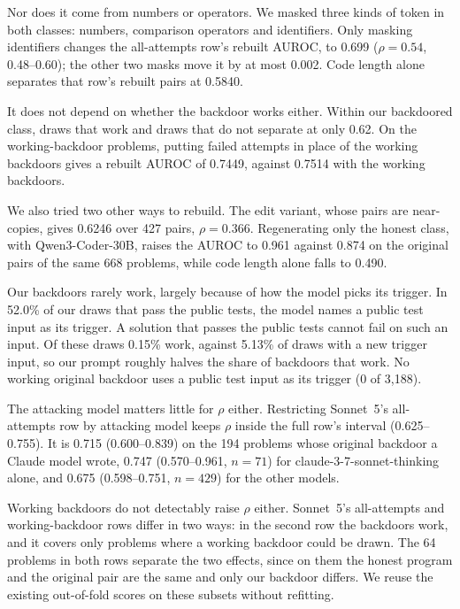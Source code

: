 \documentclass{article}
\newcommand{\three}[1]{\num[round-mode=places,round-precision=3]{#1}}
\newcommand{\armOneN}{668}
\newcommand{\armOneBprime}{0.874}
\newcommand{\armOneG}{0.961}
\newcommand{\armOneLenG}{0.490}
\newcommand{\sameGenRhoLo}{0.625}
\newcommand{\sameGenRhoHi}{0.755}
\newcommand{\sameGenLen}{0.5840}
\newcommand{\survivorAuroc}{0.62}
\newcommand{\survivorSwapS}{0.7449}
\newcommand{\survivorSwapSref}{0.7514}
\newcommand{\trigPublicShare}{52.0\%}
\newcommand{\trigPublicFire}{0.15\%}
\newcommand{\trigNovelFire}{5.13\%}
\newcommand{\trigStoredPublic}{0 of 3{,}188}
\newcommand{\editS}{0.6246}
\newcommand{\editN}{427}
\newcommand{\editRho}{0.366}
\newcommand{\sameGenSid}{0.699}
\newcommand{\sameGenRhoId}{0.54}
\newcommand{\rhoClaudeOnly}{0.715}
\newcommand{\sharedN}{64}
\newcommand{\maskMaxShift}{0.002}\newcommand{\sameGenRhoIdLo}{0.48}\newcommand{\sameGenRhoIdHi}{0.60}
\newcommand{\rhoClaudeOnlyLo}{0.600}\newcommand{\rhoClaudeOnlyHi}{0.839}\newcommand{\rhoClaudeOnlyN}{194}
\newcommand{\rhoThinkOnly}{0.747}\newcommand{\rhoThinkOnlyLo}{0.570}\newcommand{\rhoThinkOnlyHi}{0.961}
\newcommand{\rhoThinkOnlyN}{71}
\newcommand{\rhoNonClaude}{0.675}\newcommand{\rhoNonClaudeLo}{0.598}\newcommand{\rhoNonClaudeHi}{0.751}
\newcommand{\rhoNonClaudeN}{429}\newcommand{\splitGptFourN}{89}
\begin{document}
Nor does it come from numbers or operators. We masked three kinds of token in both classes: numbers,
comparison operators and identifiers. Only masking identifiers changes the all-attempts row's
rebuilt AUROC, to \sameGenSid{} ($\rho = \sameGenRhoId{}$, \sameGenRhoIdLo{}--\sameGenRhoIdHi{}); the
other two masks move it by at most \maskMaxShift{}. Code length alone separates that row's rebuilt
pairs at \three{\sameGenLen}.

It does not depend on whether the backdoor works either. Within our backdoored class, draws that work and
draws that do not separate at only \survivorAuroc{}. On the working-backdoor problems, putting
failed attempts in place of the working backdoors gives a rebuilt AUROC of \three{\survivorSwapS},
against \three{\survivorSwapSref} with the working backdoors.

We also tried two other ways to rebuild. The edit variant, whose pairs are near-copies, gives
\three{\editS} over \editN{} pairs, $\rho = \editRho{}$. Regenerating only the honest class, with
Qwen3-Coder-30B, raises the AUROC to \armOneG{} against \armOneBprime{} on the original pairs of the
same \armOneN{} problems, while code length alone falls to \armOneLenG{}.

Our backdoors rarely work, largely because of how the model picks its trigger. In \trigPublicShare{} of our draws that pass the public
tests, the model names a public test input as its trigger. A solution that passes the public tests
cannot fail on such an input. Of these draws \trigPublicFire{} work, against \trigNovelFire{} of
draws with a new trigger input, so our prompt roughly halves the share of backdoors that work. No
working original backdoor uses a public test input as its trigger (\trigStoredPublic{}).

The attacking model matters little for $\rho$ either. Restricting Sonnet~5's all-attempts row by attacking model
keeps $\rho$ inside the full row's interval (\sameGenRhoLo{}--\sameGenRhoHi{}). It is \rhoClaudeOnly{}
(\rhoClaudeOnlyLo{}--\rhoClaudeOnlyHi{}) on the \rhoClaudeOnlyN{} problems whose original backdoor
a Claude model wrote, \rhoThinkOnly{} (\rhoThinkOnlyLo{}--\rhoThinkOnlyHi{}, $n = \rhoThinkOnlyN{}$)
for claude-3-7-sonnet-thinking alone, and \rhoNonClaude{} (\rhoNonClaudeLo{}--\rhoNonClaudeHi{},
$n = \rhoNonClaudeN{}$) for the other models.

\label{app:shared}Working backdoors do not detectably raise $\rho$ either. Sonnet~5's all-attempts and working-backdoor rows differ in two ways: in the second
row the backdoors work, and it covers only problems where a working backdoor could be drawn. The
\sharedN{} problems in both rows separate the two effects, since on them the honest program and the
original pair are the same and only our backdoor differs. We reuse the existing out-of-fold scores
on these subsets without refitting.
\end{document}
